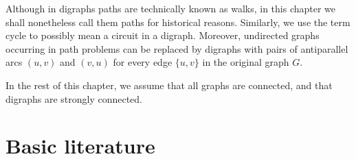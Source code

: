 \documentclass[a4paper]{book}
\theoremstyle{changebreak}                %
\begin{document}
Although in digraphs paths are technically
known as walks, in this chapter we shall nonetheless call
them paths for historical reasons. Similarly, we use the term
cycle to possibly mean a circuit in a
digraph. Moreover, undirected graphs occurring in path problems can be
replaced by digraphs with pairs of antiparallel arcs $(u,v)$ and
$(v,u)$ for every edge $\{u,v\}$ in the original graph $G$. 

In the rest of this chapter, we assume that all graphs are
connected, and that digraphs are strongly
connected.


\section{Basic literature}
\label{s:path:literature}
\end{document}
